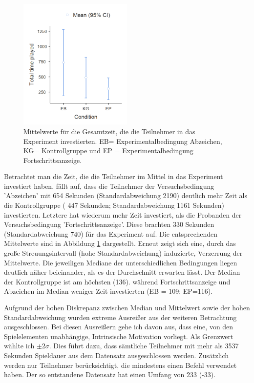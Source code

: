 \begin{figure}[htbp]
    \centering
    \includegraphics[width=0.5\textwidth]{img/auswertung/mean_time.png}
    \caption{Mittelwerte für die Gesamtzeit, die die Teilnehmer in das Experiment investierten. EB= Experimentalbedingung Abzeichen, KG= Kontrollgruppe und EP = Experimentalbedingung Fortschrittsanzeige.}
    \label{mean_time}
\end{figure}

Betrachtet man die Zeit, die die Teilnehmer im Mittel in das Experiment investiert haben, fällt auf, dass die Teilnehmer der Versuchsbedingung 'Abzeichen' mit 654 Sekunden (Standardabweichung 2190) deutlich mehr Zeit als die Kontrollgruppe ( 447 Sekunden; Standardabweichung 1161 Sekunden) investierten. Letztere hat wiederum mehr Zeit investiert, als die Probanden der Versuchsbedingung 'Fortschrittsanzeige'. Diese brachten 330 Sekunden (Standardabweichung 740) für das Experiment auf. Die entsprechenden Mittelwerte sind in Abbildung \ref{mean_time} dargestellt. Erneut zeigt sich eine, durch das große Streuungsintervall (hohe Standardabweichung) induzierte, Verzerrung der Mittelwerte. Die jeweiligen Mediane der unterschiedlichen Bedingungen liegen deutlich näher beieinander, als es der Durchschnitt erwarten lässt. Der Median der Kontrollgruppe ist am höchsten (136). während Fortschrittsanzeige und Abzeichen im Median weniger Zeit investierten (EB = 109; EP=116).

Aufgrund der hohen Diskrepanz zwischen Median und Mittelwert sowie der hohen Standardabweichung wurden extreme Ausreißer aus der weiteren Betrachtung ausgeschlossen. Bei diesen Ausreißern gehe ich davon aus, dass eine, von den Spielelementen unabhängige, Intrinsische Motivation vorliegt. Als Grenzwert wählte ich $\pm 2\sigma$. Dies führt dazu, dass sämtliche Teilnehmer mit mehr als 3537 Sekunden Spieldauer aus dem Datensatz ausgeschlossen werden. Zusätzlich werden nur Teilnehmer berücksichtigt, die mindestens einen Befehl verwendet haben. Der so entstandene Datensatz hat einen Umfang von 233 (-33).

